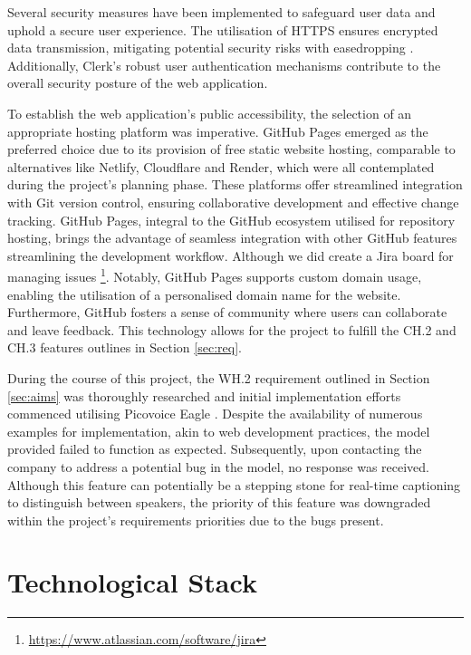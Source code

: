 \documentclass{l4proj}
\begin{document}
Several security measures have been implemented to safeguard user data and uphold a secure user experience. The utilisation of HTTPS ensures encrypted data transmission, mitigating potential security risks with easedropping \citep{kroger2019my}. Additionally, Clerk's robust user authentication mechanisms contribute to the overall security posture of the web application.

To establish the web application's public accessibility, the selection of an appropriate hosting platform was imperative. GitHub Pages emerged as the preferred choice due to its provision of free static website hosting, comparable to alternatives like Netlify, Cloudflare and Render, which were all contemplated during the project's planning phase. These platforms offer streamlined integration with Git version control, ensuring collaborative development and effective change tracking. GitHub Pages, integral to the GitHub ecosystem utilised for repository hosting, brings the advantage of seamless integration with other GitHub features streamlining the development workflow. Although we did create a Jira board for managing issues \footnote{\url{https://www.atlassian.com/software/jira}}. Notably, GitHub Pages supports custom domain usage, enabling the utilisation of a personalised domain name for the website. Furthermore, GitHub fosters a sense of community where users can collaborate and leave feedback. This technology allows for the project to fulfill the CH.2 and CH.3 features outlines in Section \ref{sec:req}.

During the course of this project, the WH.2 requirement outlined in Section \ref{sec:aims} was thoroughly researched and initial implementation efforts commenced utilising Picovoice Eagle \citep{PicovoiceWordmark}. Despite the availability of numerous examples for implementation, akin to web development practices, the model provided failed to function as expected. Subsequently, upon contacting the company to address a potential bug in the model, no response was received. Although this feature can potentially be a stepping stone for real-time captioning to distinguish between speakers, the priority of this feature was downgraded within the project's requirements priorities due to the bugs present. 

\section{Technological Stack}
\label{sec:tech-stack}

\end{document}
